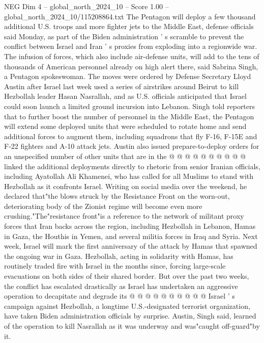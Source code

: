 \begin{textsample}{NEG Dim 4 – global\_north\_2024\_10 – Score 1.00 – global\_north\_2024\_10/115208864.txt}  \label{ex:f4_neg_056}
The Pentagon will deploy a few thousand additional U.S. troops and more fighter jets to the Middle East, defense officials said Monday, as part of the Biden administration ' s scramble to prevent the conflict between Israel and Iran ' s proxies from exploding into a regionwide war.
The infusion of forces, which also include air-defense units, will add to the tens of thousands of American personnel already on high alert there, said Sabrina Singh, a Pentagon spokeswoman.
The moves were ordered by Defense Secretary Lloyd Austin after Israel last week used a series of airstrikes around Beirut to kill Hezbollah leader Hasan Nasrallah, and as U.S. officials anticipated that Israel could soon launch a limited ground incursion into Lebanon.
Singh told reporters that to further boost the number of personnel in the Middle East, the Pentagon will extend some deployed units that were scheduled to rotate home and send additional forces to augment them, including squadrons that fly F-16, F-15E and F-22 fighters and A-10 attack jets.
Austin also issued prepare-to-deploy orders for an unspecified number of other units that are in the @ @ @ @ @ @ @ @ @ @ linked the additional deployments directly to rhetoric from senior Iranian officials, including Ayatollah Ali Khamenei, who has called for all Muslims to stand with Hezbollah as it confronts Israel.
Writing on social media over the weekend, he declared that"the blows struck by the Resistance Front on the worn-out, deteriorating body of the Zionist regime will become even more crushing."The"resistance front"is a reference to the network of militant proxy forces that Iran backs across the region, including Hezbollah in Lebanon, Hamas in Gaza, the Houthis in Yemen, and several militia forces in Iraq and Syria.
Next week, Israel will mark the first anniversary of the attack by Hamas that spawned the ongoing war in Gaza.
Hezbollah, acting in solidarity with Hamas, has routinely traded fire with Israel in the months since, forcing large-scale evacuations on both sides of their shared border.
But over the past two weeks, the conflict has escalated drastically as Israel has undertaken an aggressive operation to decapitate and degrade its @ @ @ @ @ @ @ @ @ @ Israel ' s campaign against Hezbollah, a longtime U.S.-designated terrorist organization, have taken Biden administration officials by surprise.
Austin, Singh said, learned of the operation to kill Nasrallah as it was underway and was"caught off-guard"by it.

\end{textsample}
